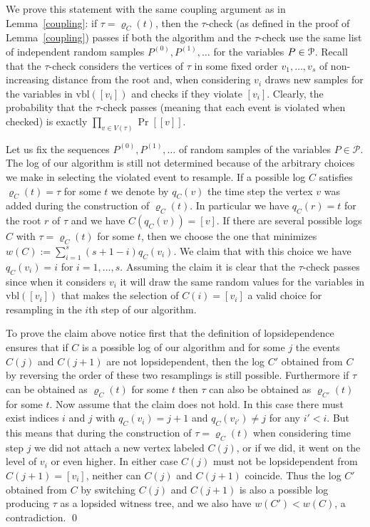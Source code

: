 \documentclass[11pt,a4paper]{article}
\DeclareMathOperator*{\pr}{Pr}
\begin{document}
\proof We prove this statement with the same coupling argument as in
Lemma~\ref{coupling}: if $\tau=\varrho_C(t)$, then the $\tau$-check (as
defined in the proof of Lemma~\ref{coupling})
passes if both the algorithm and the $\tau$-check use the same list of
independent random samples $P^{(0)},P^{(1)},\ldots$ for the variables
$P\in\cal P$. Recall that the $\tau$-check considers the vertices of $\tau$ in
some fixed order $v_1,\ldots,v_s$ of non-increasing distance from the root
and, when considering $v_i$ draws new samples for the variables in
$\mbox{vbl}([v_i])$ and checks if they violate $[v_i]$. Clearly, the
probability that the $\tau$-check passes (meaning that each event is violated
when checked) is exactly $\prod_{v\in V(\tau)}\pr[[v]]$.

Let us fix the
sequences $P^{(0)}, P^{(1)},\ldots$ of random samples of the
variables $P\in\mathcal{P}$. The log of our algorithm is still not determined
because of the arbitrary choices we make in selecting the violated event to
resample. If a possible log $C$ satisfies $\varrho_C(t)=\tau$ for some $t$ we denote by
$q_C(v)$ the time step the vertex $v$ was added during the construction
of $\varrho_C(t)$. In particular we have $q_C(r)=t$ for the root $r$ of $\tau$
and we have $C(q_C(v))=[v]$.
If there are several possible logs $C$ with $\tau=\varrho_C(t)$ for some $t$,
then we choose the one that minimizes
$w(C):=\sum_{i=1}^s(s+1-i)q_C(v_i)$. We claim that with this choice we have
$q_C(v_i)=i$ for $i=1,\ldots,s$. Assuming the claim it is clear that the
$\tau$-check passes since when it considers $v_i$ it will draw the same random
values for the variables in $\mbox{vbl}([v_i])$ that makes the selection of
$C(i)=[v_i]$ a valid choice for resampling in the $i$th step of our algorithm.

To prove the claim above notice first that the definition of lopsidependence
ensures that if $C$ is a possible log of our algorithm and for some $j$
the events $C(j)$ and
$C(j+1)$ are not lopsidependent, then the log $C'$ obtained
from $C$ by reversing the order of these two resamplings is still
possible. Furthermore if $\tau$ can be obtained as $\varrho_C(t)$ for some $t$
then $\tau$ can also be obtained as $\varrho_{C'}(t)$ for some $t$. Now assume
that the claim does not hold. In this case there must exist indices $i$ and
$j$ with $q_C(v_i)=j+1$ and $q_C(v_{i'})\ne j$ for any $i'<i$. But this means that
during the construction of $\tau=\varrho_C(t)$ when considering time step $j$
we did not attach a new vertex labeled $C(j)$, or if we did, it went on the
level of $v_i$ or even higher. In either case $C(j)$ must not be
lopsidependent from $C(j+1)=[v_i]$, neither can $C(j)$ and $C(j+1)$
coincide. Thus the log $C'$ obtained from $C$ by switching $C(j)$ and $C(j+1)$
is also a possible log producing $\tau$ as a lopsided witness tree, and we
also have $w(C')<w(C)$, a contradiction. \qed
\end{document}
